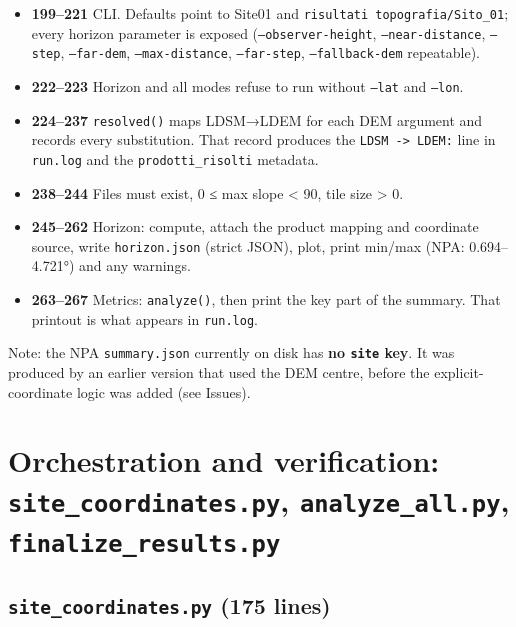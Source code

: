 \documentclass[11pt,a4paper]{article}
\providecommand{\tightlist}{\setlength{\itemsep}{0pt}\setlength{\parskip}{0pt}}
\begin{document}
\begin{itemize}
\tightlist
\item
  \textbf{199--221} CLI. Defaults point to Site01 and
  \texttt{risultati topografia/Sito\_01}; every horizon
  parameter is exposed (\texttt{--observer-height},
  \texttt{--near-distance},
  \texttt{--step}, \texttt{--far-dem},
  \texttt{--max-distance},
  \texttt{--far-step},
  \texttt{--fallback-dem} repeatable).
\item
  \textbf{222--223} Horizon and all modes refuse to run without
  \texttt{--lat} and \texttt{--lon}.
\item
  \textbf{224--237} \texttt{resolved()} maps LDSM→LDEM
  for each DEM argument and records every substitution. That record
  produces the \texttt{LDSM -> LDEM:} line in
  \texttt{run.log} and the
  \texttt{prodotti\_risolti} metadata.
\item
  \textbf{238--244} Files must exist, 0 ≤ max slope \textless{} 90, tile
  size \textgreater{} 0.
\item
  \textbf{245--262} Horizon: compute, attach the product mapping and
  coordinate source, write \texttt{horizon.json}
  (strict JSON), plot, print min/max (NPA: 0.694--4.721°) and any
  warnings.
\item
  \textbf{263--267} Metrics: \texttt{analyze()}, then
  print the key part of the summary. That printout is what appears in
  \texttt{run.log}.
\end{itemize}

Note: the NPA \texttt{summary.json} currently on disk
has \textbf{no \texttt{site} key}. It was produced by
an earlier version that used the DEM centre, before the
explicit-coordinate logic was added (see Issues).

\hypertarget{orchestration-and-verification-site_coordinates.py-analyze_all.py-finalize_results.py}{%
\section[Orchestration and verification]{\texorpdfstring{Orchestration and verification:
\texttt{site\_coordinates.py}, \texttt{analyze\_all.py},
\texttt{finalize\_results.py}}{Orchestration and verification: site\_coordinates.py, analyze\_all.py, finalize\_results.py}}\label{orchestration-and-verification-site_coordinates.py-analyze_all.py-finalize_results.py}}

\hypertarget{site_coordinates.py-175-lines}{%
\subsection{\texorpdfstring{\texttt{site\_coordinates.py} (175
lines)}{site\_coordinates.py (175 lines)}}\label{site_coordinates.py-175-lines}}
\end{document}
